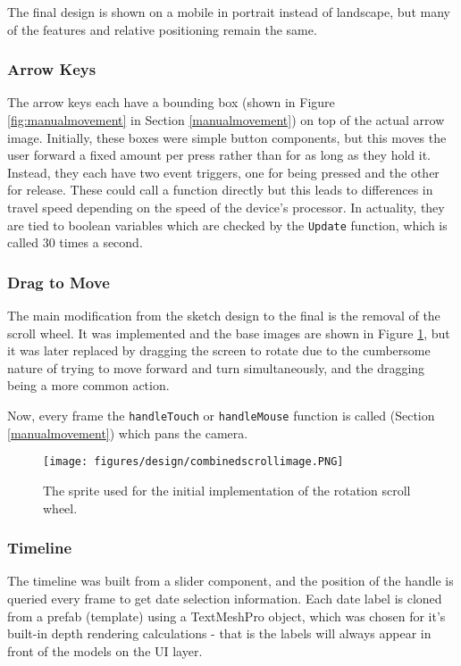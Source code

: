 \documentclass{article}
\begin{document}
The final design is shown on a mobile in portrait instead of landscape, but many of the features and relative positioning remain the same.

\subsubsection{Arrow Keys}
The arrow keys each have a bounding box (shown in Figure \ref{fig:manualmovement} in Section \ref{manualmovement}) on top of the actual arrow image. Initially, these boxes were simple button components, but this moves the user forward a fixed amount per press rather than for as long as they hold it. Instead, they each have two event triggers, one for being pressed and the other for release. These could call a function directly but this leads to differences in travel speed depending on the speed of the device's processor. In actuality, they are tied to boolean variables which are checked by the \verb|Update| function, which is called 30 times a second.

\subsubsection{Drag to Move}
The main modification from the sketch design to the final is the removal of the scroll wheel. It was implemented and the base images are shown in Figure \ref{fig:scroll}, but it was later replaced by dragging the screen to rotate due to the cumbersome nature of trying to move forward and turn simultaneously, and the dragging being a more common action.

Now, every frame the \verb|handleTouch| or \verb|handleMouse| function is called (Section \ref{manualmovement}) which pans the camera.

\begin{figure}[h!]
    \centering
    \texttt{[image: figures/design/combinedscrollimage.PNG]}
        \caption{The sprite used for the initial implementation of the rotation scroll wheel.}
        \label{fig:scroll}
\end{figure}

\subsubsection{Timeline}
The timeline was built from a slider component, and the position of the handle is queried every frame to get date selection information. Each date label is cloned from a prefab (template) using a TextMeshPro object, which was chosen for it's built-in depth rendering calculations - that is the labels will always appear in front of the models on the UI layer.
\end{document}
